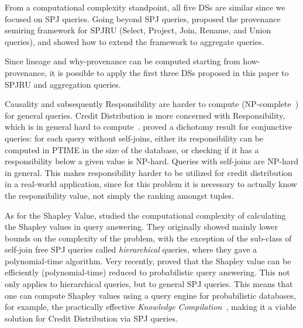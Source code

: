 \documentclass[preprint,12pt,sort&compress]{elsarticle}
\newcommand{\rtwo}[1]{\textcolor{reviewer2}{#1}}
\newcommand{\eat}[1]{}
\newcommand{\scream}[1]{{\bf * #1 *}{\typeout{#1}}}
\begin{document}
\rtwo{From a computational complexity standpoint, all five DSs are similar since we focused on SPJ queries. Going beyond SPJ queries, \citet{howProvenanceGreen} proposed the provenance semiring framework for SPJRU (Select, Project, Join, Rename, and Union queries), and \citet{AmsterdamerDT11} showed how to extend the framework to aggregate queries.
\eat{ queries, thus we could expand our approach to those types of queries too.  \citet{AmsterdamerDT11} showed that it is also possible to compute provenance polynomials for aggregate queries by annotating with provenance tokens also the \emph{individual values} within the tuples, using provenance to describe the values computation. 
} 
Since lineage and why-provenance can be computed starting from how-provenance, it is possible to apply the first three DSs proposed in this paper to SPJRU and aggregation queries.} 
\rtwo{Causality and subsequently Responsibility are harder to compute (NP-complete~\cite{MeliouGMS11}) for general queries. Credit Distribution is more concerned with Responsibility, which is in general hard to compute~\cite{ChocklerH04}. \citet{MeliouGMS11} proved a dichotomy result for conjunctive queries: for each query without self-joins, either its responsibility can be computed in PTIME in the size of the database, or checking if it has a responsibility below a given value is NP-hard. Queries with self-joins are NP-hard in general. This makes responsibility harder to be utilized for credit distribution in a real-world application, since for this problem it is necessary to actually know the responsibility value, not simply the ranking amongst tuples.}

\rtwo{As for the Shapley Value, \citet{LivshitsBKS20} studied the computational complexity of calculating the Shapley values in query answering. They originally showed mainly lower bounds on the complexity of the problem, with the exception of the sub-class of self-join free SPJ queries called \emph{hierarchical} queries, where they gave a polynomial-time algorithm. 
Very recently, \citet{DFKM22} proved that the Shapley value can be efficiently (polynomial-time) reduced to probabilistic query answering. This not only applies to hierarchical queries, but to general SPJ queries. This means that one can compute Shapley values using a query engine for probabilistic databases, for example, the practically effective \emph{Knowledge Compilation}~\cite{JhaS13}, making it a viable solution for Credit Distribution via SPJ queries.} 
\end{document}
